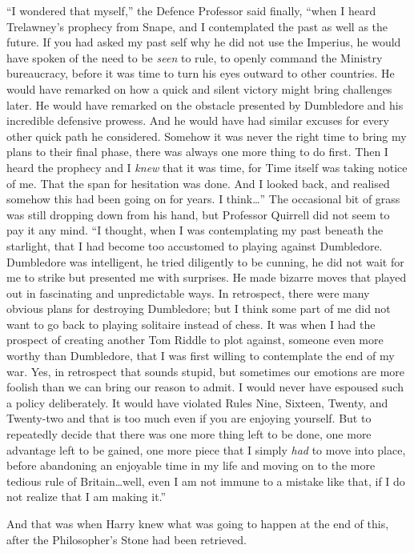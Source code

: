 “I wondered that myself,” the Defence Professor said finally, “when I heard Trelawney’s prophecy from Snape, and I contemplated the past as well as the future. If you had asked my past self why he did not use the Imperius, he would have spoken of the need to be \emph{seen} to rule, to openly command the Ministry bureaucracy, before it was time to turn his eyes outward to other countries. He would have remarked on how a quick and silent victory might bring challenges later. He would have remarked on the obstacle presented by Dumbledore and his incredible defensive prowess. And he would have had similar excuses for every other quick path he considered. Somehow it was never the right time to bring my plans to their final phase, there was always one more thing to do first. Then I heard the prophecy and I \emph{knew} that it was time, for Time itself was taking notice of me. That the span for hesitation was done. And I looked back, and realised somehow this had been going on for years. I think…” The occasional bit of grass was still dropping down from his hand, but Professor Quirrell did not seem to pay it any mind. “I thought, when I was contemplating my past beneath the starlight, that I had become too accustomed to playing against Dumbledore. Dumbledore was intelligent, he tried diligently to be cunning, he did not wait for me to strike but presented me with surprises. He made bizarre moves that played out in fascinating and unpredictable ways. In retrospect, there were many obvious plans for destroying Dumbledore; but I think some part of me did not want to go back to playing solitaire instead of chess. It was when I had the prospect of creating another Tom Riddle to plot against, someone even more worthy than Dumbledore, that I was first willing to contemplate the end of my war. Yes, in retrospect that sounds stupid, but sometimes our emotions are more foolish than we can bring our reason to admit. I would never have espoused such a policy deliberately. It would have violated Rules Nine, Sixteen, Twenty, and Twenty-two and that is too much even if you are enjoying yourself. But to repeatedly decide that there was one more thing left to be done, one more advantage left to be gained, one more piece that I simply \emph{had} to move into place, before abandoning an enjoyable time in my life and moving on to the more tedious rule of Britain…well, even I am not immune to a mistake like that, if I do not realize that I am making it.”

And that was when Harry knew what was going to happen at the end of this, after the Philosopher’s Stone had been retrieved.

